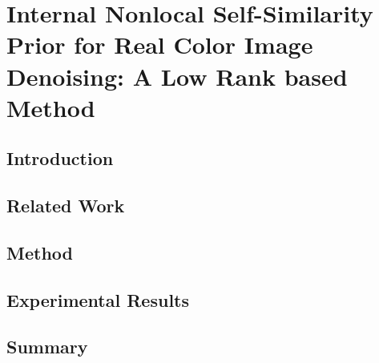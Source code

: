 %
\chapter{Internal Nonlocal Self-Similarity Prior for Real Color Image Denoising: A Low Rank based Method}
\label{sec:feature}


\blindtext

\section{Introduction}
\label{sec:feature:intro}

\blindtext

\section{Related Work}
\label{sec:feature:related}

\blindtext

\section{Method}
\label{sec:feature:theory}

\blindtext

\section{Experimental Results}
\label{sec:feature:results}

\blindtext

\section{Summary}
\label{sec:feature:summary}

\blindtext

